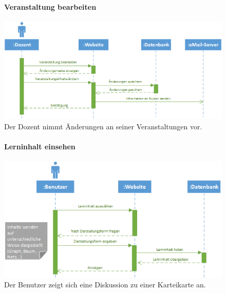 \documentclass[12pt,a4paper]{article}
\begin{document}
\begin{figure}[H]
	\centering
	\paragraph{Veranstaltung bearbeiten}
	\includegraphics[width=\textwidth]{Bilder/Sequenzdiagramme/VeranstaltungBearbeiten.png}
	\caption{Der Dozent nimmt Änderungen an seiner Veranstaltungen vor.}
	\label{SzVeranstaltungBearbeiten}
\end{figure}
\begin{figure}[H]
	\centering
	\paragraph{Lerninhalt einsehen}
	\includegraphics[width=\textwidth]{Bilder/Sequenzdiagramme/LehrinhalteEinsehen.png}
	\caption{Der Benutzer zeigt sich eine Diskussion zu einer Karteikarte an.}
	\label{SzLerninhaltEinsehen}
\end{figure}
\end{document}
